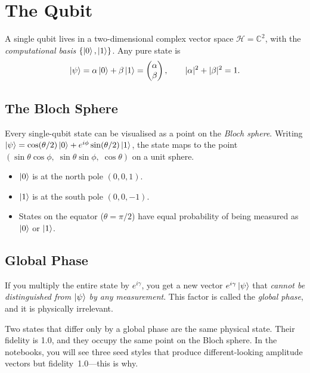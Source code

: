 \documentclass[11pt,a4paper,twoside]{report}
\theoremstyle{definition}
\newcommand{\HH}{\mathcal{H}}
\begin{document}
\section{The Qubit}

A single qubit lives in a two-dimensional complex vector space
$\HH = \mathbb{C}^2$, with the \emph{computational basis}
$\{\ket{0}, \ket{1}\}$. Any pure state is
\begin{equation}
  \ket{\psi} = \alpha\ket{0} + \beta\ket{1}
  = \begin{pmatrix} \alpha \\ \beta \end{pmatrix},
  \qquad |\alpha|^2 + |\beta|^2 = 1.
\end{equation}

\subsection{The Bloch Sphere}

Every single-qubit state can be visualised as a point on the
\emph{Bloch sphere}. Writing
$\ket{\psi} = \cos(\theta/2)\ket{0} + e^{i\phi}\sin(\theta/2)\ket{1}$,
the state maps to the point $(\sin\theta\cos\phi,\;
\sin\theta\sin\phi,\; \cos\theta)$ on a unit sphere.

\begin{itemize}
  \item $\ket{0}$ is at the north pole $(0,0,1)$.
  \item $\ket{1}$ is at the south pole $(0,0,-1)$.
  \item States on the equator ($\theta = \pi/2$) have equal probability
        of being measured as $\ket{0}$ or $\ket{1}$.
\end{itemize}

\subsection{Global Phase}

If you multiply the entire state by $e^{i\gamma}$, you get a new vector
$e^{i\gamma}\ket{\psi}$ that \emph{cannot be distinguished from
$\ket{\psi}$ by any measurement}. This factor is called the
\emph{global phase}, and it is physically irrelevant.

\begin{warning}
Two states that differ only by a global phase are the same physical
state. Their fidelity is 1.0, and they occupy the same point on the
Bloch sphere. In the notebooks, you will see three seed styles that
produce different-looking amplitude vectors but fidelity~1.0---this is
why.
\end{warning}
\end{document}
